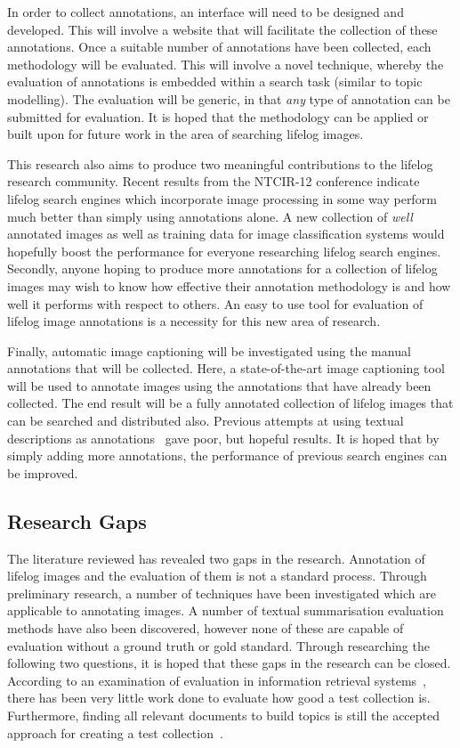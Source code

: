 In order to collect annotations, an interface will need to be designed and developed. This will involve a website that will facilitate the collection of these annotations. Once a suitable number of annotations have been collected, each methodology will be evaluated. This will involve a novel technique, whereby the evaluation of annotations is embedded within a search task (similar to topic modelling). The evaluation will be generic, in that \textit{any} type of annotation can be submitted for evaluation. It is hoped that the methodology can be applied or built upon for future work in the area of searching lifelog images.

This research also aims to produce two meaningful contributions to the lifelog research community. Recent results from the NTCIR-12 conference indicate lifelog search engines which incorporate image processing in some way perform much better than simply using annotations alone. A new collection of \textit{well} annotated images as well as training data for image classification systems would hopefully boost the performance for everyone researching lifelog search engines. Secondly, anyone hoping to produce more annotations for a collection of lifelog images may wish to know how effective their annotation methodology is and how well it performs with respect to others. An easy to use tool for evaluation of lifelog image annotations is a necessity for this new area of research.

Finally, automatic image captioning will be investigated using the manual annotations that will be collected. Here, a state-of-the-art image captioning tool will be used to annotate images using the annotations that have already been collected. The end result will be a fully annotated collection of lifelog images that can be searched and distributed also. Previous attempts at using textual descriptions as annotations~\citep{scells2016qut} gave poor, but hopeful results. It is hoped that by simply adding more annotations, the performance of previous search engines can be improved.

\subsection{Research Gaps}

The literature reviewed has revealed two gaps in the research. Annotation of lifelog images and the evaluation of them is not a standard process. Through preliminary research, a number of techniques have been investigated which are applicable to annotating images. A number of textual summarisation evaluation methods have also been discovered, however none of these are capable of evaluation without a ground truth or gold standard. Through researching the following two questions, it is hoped that these gaps in the research can be closed. According to an examination of evaluation in information retrieval systems~\citep[p. 24]{sanderson2010test}, there has been very little work done to evaluate how good a test collection is. Furthermore, finding all relevant documents to build topics is still the accepted approach for creating a test collection~\citep{cooper1973selecting}.

